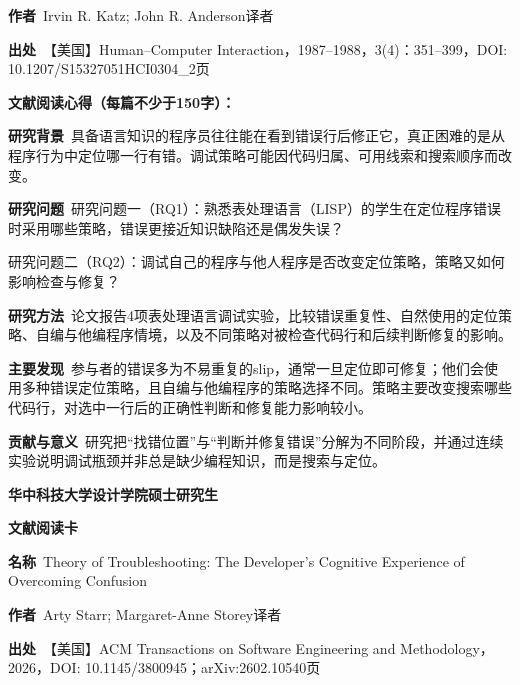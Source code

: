 \noindent\textbf{作者}\ Irvin R. Katz; John R. Anderson\quad 译者\par
\noindent\textbf{出处}\ 【美国】Human–Computer Interaction，1987–1988，3(4)：351–399，DOI: 10.1207/S15327051HCI0304\_2\quad 页\par
\vspace{0.35em}
\noindent\textbf{文献阅读心得（每篇不少于150字）：}\par
\noindent\textbf{研究背景}\ 具备语言知识的程序员往往能在看到错误行后修正它，真正困难的是从程序行为中定位哪一行有错。调试策略可能因代码归属、可用线索和搜索顺序而改变。\par
\noindent\textbf{研究问题}\ 研究问题一（RQ1）：熟悉表处理语言（LISP）的学生在定位程序错误时采用哪些策略，错误更接近知识缺陷还是偶发失误？\par
研究问题二（RQ2）：调试自己的程序与他人程序是否改变定位策略，策略又如何影响检查与修复？\par
\noindent\textbf{研究方法}\ 论文报告4项表处理语言调试实验，比较错误重复性、自然使用的定位策略、自编与他编程序情境，以及不同策略对被检查代码行和后续判断修复的影响。\par
\noindent\textbf{主要发现}\ 参与者的错误多为不易重复的slip，通常一旦定位即可修复；他们会使用多种错误定位策略，且自编与他编程序的策略选择不同。策略主要改变搜索哪些代码行，对选中一行后的正确性判断和修复能力影响较小。\par
\noindent\textbf{贡献与意义}\ 研究把“找错位置”与“判断并修复错误”分解为不同阶段，并通过连续实验说明调试瓶颈并非总是缺少编程知识，而是搜索与定位。\par
\clearpage
\begin{center}
{\songti\bfseries\fontsize{18.5pt}{27.75pt}\selectfont 华中科技大学设计学院硕士研究生\par}
{\songti\bfseries\fontsize{18.5pt}{27.75pt}\selectfont 文献阅读卡\par}
\end{center}
\vspace{0.25em}
\noindent\underline{}\par
\vspace{0.35em}
\noindent\textbf{名称}\ Theory of Troubleshooting: The Developer’s Cognitive Experience of Overcoming Confusion\par
\noindent\textbf{作者}\ Arty Starr; Margaret-Anne Storey\quad 译者\par
\noindent\textbf{出处}\ 【美国】ACM Transactions on Software Engineering and Methodology，2026，DOI: 10.1145/3800945；arXiv:2602.10540\quad 页\par
